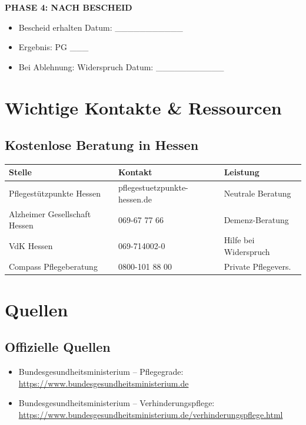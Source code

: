 \documentclass[11pt,a4paper]{article}
\begin{document}
\begin{graybox}
\vspace{0.5cm}
\textbf{PHASE 4: NACH BESCHEID}
\begin{itemize}[noitemsep]
    \item[$\square$] Bescheid erhalten \hfill Datum: \_\_\_\_\_\_\_\_\_\_\_
    \item[$\square$] Ergebnis: PG \_\_\_
    \item[$\square$] Bei Ablehnung: Widerspruch \hfill Datum: \_\_\_\_\_\_\_\_\_\_\_
\end{itemize}
\end{graybox}

\section{Wichtige Kontakte \& Ressourcen}

\subsection{Kostenlose Beratung in Hessen}

\begin{center}
\begin{tabular}{lll}
\toprule
\textbf{Stelle} & \textbf{Kontakt} & \textbf{Leistung} \\
\midrule
Pflegestützpunkte Hessen & pflegestuetzpunkte-hessen.de & Neutrale Beratung \\
Alzheimer Gesellschaft Hessen & 069-67 77 66 & Demenz-Beratung \\
VdK Hessen & 069-714002-0 & Hilfe bei Widerspruch \\
Compass Pflegeberatung & 0800-101 88 00 & Private Pflegevers. \\
\bottomrule
\end{tabular}
\end{center}

\section{Quellen}

\subsection{Offizielle Quellen}
\begin{itemize}[noitemsep]
    \item Bundesgesundheitsministerium -- Pflegegrade: \url{https://www.bundesgesundheitsministerium.de}
    \item Bundesgesundheitsministerium -- Verhinderungspflege: \url{https://www.bundesgesundheitsministerium.de/verhinderungspflege.html}
\end{itemize}
\end{document}
